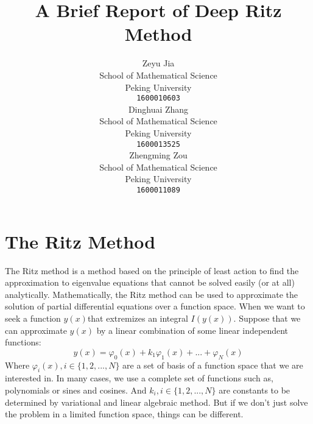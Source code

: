 \documentclass{article}
\title{A Brief Report of Deep Ritz Method}
\author{
  Zeyu Jia\\School of Mathematical Science\\Peking University\\ \texttt{1600010603} \\
  \And
  Dinghuai Zhang\\School of Mathematical Science\\Peking University\\ \texttt{1600013525}\\
  \And
  Zhengming Zou\\School of Mathematical Science\\Peking University \\ \texttt{1600011089}
}
\begin{document}

\maketitle

\begin{abstract}
\end{abstract}


\section{The Ritz Method}
\par The Ritz method is a method based on the principle of least action to find the approximation to eigenvalue equations that cannot be solved easily (or at all) analytically. Mathematically, the Ritz method can be used to approximate the solution of partial differential equations over a function space. When we want to seek a function $y(x)$that extremizes an integral $I(y(x))$. Suppose that we can approximate $y(x)$ by a linear combination of some linear independent  functions:
\begin{equation}
y(x)=\varphi_0(x)+k_1\varphi_1(x)+...+\varphi_N(x)
\end{equation}
Where $\varphi_{i}(x),i\in\{1,2,...,N\}$  are a set of basis of a function space that we are interested in. In many cases, we use a complete set of functions such as, polynomials or sines and cosines. And $k_i,i\in\{1,2,...,N\}$ are constants to be determined by variational and linear algebraic method. But if we don't just solve the problem in a limited function space, things can be different. 
\end{document}
